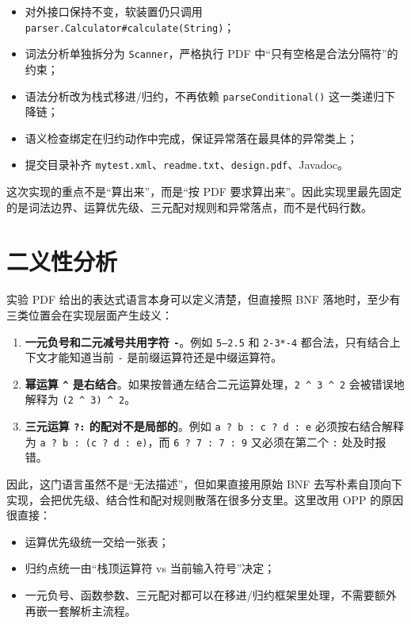 \documentclass[12pt,a4paper,fontset=none]{ctexart}
\begin{document}
\begin{itemize}
  \item 对外接口保持不变，软装置仍只调用 \texttt{parser.Calculator\#calculate(String)}；
  \item 词法分析单独拆分为 \texttt{Scanner}，严格执行 PDF 中“只有空格是合法分隔符”的约束；
  \item 语法分析改为栈式移进/归约，不再依赖 \texttt{parseConditional()} 这一类递归下降链；
  \item 语义检查绑定在归约动作中完成，保证异常落在最具体的异常类上；
  \item 提交目录补齐 \texttt{mytest.xml}、\texttt{readme.txt}、\texttt{design.pdf}、Javadoc。
\end{itemize}

\begin{summaryBox}
这次实现的重点不是“算出来”，而是“按 PDF 要求算出来”。因此实现里最先固定的是词法边界、运算优先级、三元配对规则和异常落点，而不是代码行数。
\end{summaryBox}

\section{二义性分析}

实验 PDF 给出的表达式语言本身可以定义清楚，但直接照 BNF 落地时，至少有三类位置会在实现层面产生歧义：

\begin{enumerate}
  \item \textbf{一元负号和二元减号共用字符 \texttt{-}}。例如 \texttt{5--2.5} 和 \texttt{2-3*-4} 都合法，只有结合上下文才能知道当前 \texttt{-} 是前缀运算符还是中缀运算符。
  \item \textbf{幂运算 \texttt{\^{}} 是右结合}。如果按普通左结合二元运算处理，\texttt{2 \^{} 3 \^{} 2} 会被错误地解释为 \texttt{(2 \^{} 3) \^{} 2}。
  \item \textbf{三元运算 \texttt{?:} 的配对不是局部的}。例如 \texttt{a ? b : c ? d : e} 必须按右结合解释为 \texttt{a ? b : (c ? d : e)}，而 \texttt{6 ? 7 : 7 : 9} 又必须在第二个 \texttt{:} 处及时报错。
\end{enumerate}

因此，这门语言虽然不是“无法描述”，但如果直接用原始 BNF 去写朴素自顶向下实现，会把优先级、结合性和配对规则散落在很多分支里。这里改用 OPP 的原因很直接：

\begin{itemize}
  \item 运算优先级统一交给一张表；
  \item 归约点统一由“栈顶运算符 vs 当前输入符号”决定；
  \item 一元负号、函数参数、三元配对都可以在移进/归约框架里处理，不需要额外再嵌一套解析主流程。
\end{itemize}
\end{document}
